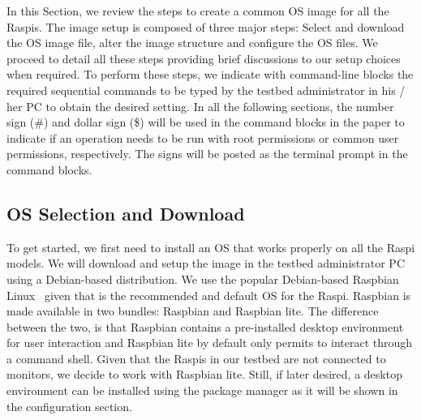 \label{sec:image_setup}
In this Section, we review the steps to create a common \ac{OS} image for
all the \ac{Raspi}s. The image setup is composed of three major steps:
Select and download the \ac{OS} image file, alter the image structure and
configure the \ac{OS} files. We proceed to detail all these steps providing
brief discussions to our setup choices when required. To perform these
steps, we indicate with command-line blocks the required sequential
commands to be typed by the testbed administrator in his / her \ac{PC}
to obtain the desired setting. In all the following sections, the number
sign (\#) and dollar sign (\$) will be used in the command blocks in the
paper to indicate if an operation needs to be run with root permissions or
common user permissions, respectively. The signs will be posted as the
terminal prompt in the command blocks.

\subsection{OS Selection and Download}

To get started, we first need to install an \ac{OS} that works properly
on all the \ac{Raspi} models. We will download and setup the image in
the testbed administrator \ac{PC} using a Debian-based distribution. We
use the popular Debian-based Raspbian Linux~\cite{raspbian} given that is
the recommended and default \ac{OS} for the \ac{Raspi}. Raspbian is made
available in two bundles: Raspbian and Raspbian lite. The difference
between the two, is that Raspbian contains a pre-installed desktop environment
for user interaction and Raspbian lite by default only permits to interact
through a command shell. Given that the \ac{Raspi}s in our testbed are not
connected to monitors, we decide to work with Raspbian lite. Still, if later
desired, a desktop environment can be installed using the package manager
as it will be shown in the configuration section.


